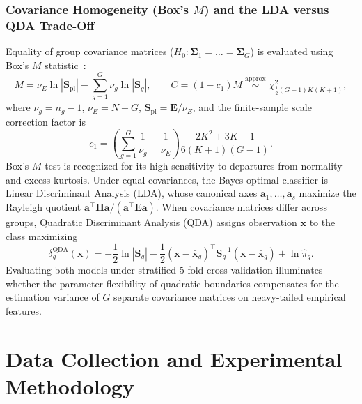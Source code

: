 \documentclass[12pt, a4paper, oneside]{report}
\theoremstyle{definition}
\newcommand{\vect}[1]{\mathbf{#1}}
\newcommand{\mat}[1]{\mathbf{#1}}
\begin{document}
\subsection{Covariance Homogeneity (Box's \texorpdfstring{$M$}{M}) and the LDA versus QDA Trade-Off}

Equality of group covariance matrices ($H_0 : \mat{\Sigma}_1 = \dots = \mat{\Sigma}_G$) is evaluated using Box's $M$ statistic~\cite{box1949general}:
\begin{equation}
    M = \nu_E \ln |\mat{S}_{\text{pl}}| - \sum_{g=1}^{G} \nu_g \ln |\mat{S}_g|,
    \qquad
    C = (1 - c_1) M \;\stackrel{\text{approx}}{\sim}\; \chi^2_{\frac{1}{2}(G-1)K(K+1)},
    \label{eq:box_m}
\end{equation}
where $\nu_g = n_g - 1$, $\nu_E = N - G$, $\mat{S}_{\text{pl}} = \mat{E}/\nu_E$, and the finite-sample scale correction factor is
\begin{equation}
    c_1 = \left(\sum_{g=1}^{G}\frac{1}{\nu_g} - \frac{1}{\nu_E}\right)\frac{2K^2 + 3K - 1}{6(K + 1)(G - 1)}.
    \label{eq:box_m_c1}
\end{equation}
Box's $M$ test is recognized for its high sensitivity to departures from normality and excess kurtosis. Under equal covariances, the Bayes-optimal classifier is Linear Discriminant Analysis (LDA), whose canonical axes $\vect{a}_1, \dots, \vect{a}_s$ maximize the Rayleigh quotient $\vect{a}^\top \mat{H}\vect{a} / (\vect{a}^\top \mat{E}\vect{a})$. When covariance matrices differ across groups, Quadratic Discriminant Analysis (QDA) assigns observation $\vect{x}$ to the class maximizing
\begin{equation}
    \delta_g^{\text{QDA}}(\vect{x}) = -\frac{1}{2}\ln |\mat{S}_g| - \frac{1}{2}(\vect{x} - \bar{\vect{x}}_g)^\top \mat{S}_g^{-1} (\vect{x} - \bar{\vect{x}}_g) + \ln \hat{\pi}_g.
    \label{eq:qda_rule}
\end{equation}
Evaluating both models under stratified 5-fold cross-validation illuminates whether the parameter flexibility of quadratic boundaries compensates for the estimation variance of $G$ separate covariance matrices on heavy-tailed empirical features.

\chapter{Data Collection and Experimental Methodology}
\end{document}
